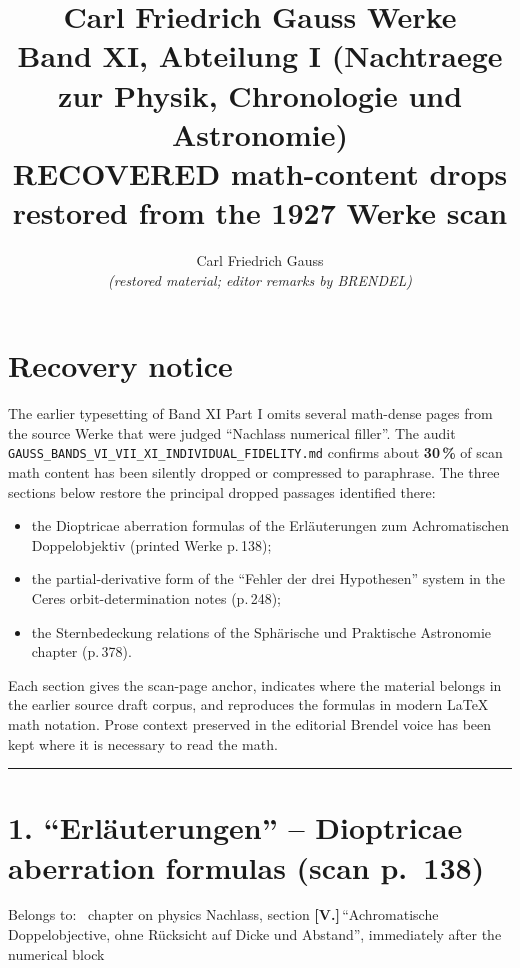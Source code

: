 \documentclass[10pt,a4paper]{article}
\title{\Huge Carl Friedrich Gauss Werke\\[0.4em]
\Large Band XI, Abteilung I (Nachtraege zur Physik, Chronologie und Astronomie)\\[0.6em]
\large RECOVERED math-content drops\\
restored from the 1927 Werke scan}
\author{Carl Friedrich Gauss \\ \textit{(restored material; editor remarks by BRENDEL)}}
\date{}
\begin{document}
\maketitle
\thispagestyle{empty}

\section*{Recovery notice}

\noindent The earlier typesetting of Band XI Part I omits several math-dense pages from
the source Werke that were judged ``Nachlass numerical filler''. The audit
\texttt{GAUSS\_BANDS\_VI\_VII\_XI\_INDIVIDUAL\_FIDELITY.md} confirms about \textbf{30\,\%}
of scan math content has been silently dropped or compressed to paraphrase.
The three sections below restore the principal dropped passages identified there:

\begin{itemize}
  \item the Dioptricae aberration formulas of the Erl\"auterungen zum
        Achromatischen Doppelobjektiv (printed Werke p.\,138);
  \item the partial-derivative form of the ``Fehler der drei Hypothesen''
        system in the Ceres orbit-determination notes (p.\,248);
  \item the Stern\-be\-deckung relations of the Sph\"arische und Praktische
        Astronomie chapter (p.\,378).
\end{itemize}

Each section gives the scan-page anchor, indicates where the material
belongs in the earlier source draft corpus, and reproduces the formulas in modern
\LaTeX{} math notation. Prose context preserved in the editorial Brendel
voice has been kept where it is necessary to read the math.

\bigskip\hrule\bigskip

\section*{1. \enquote{Erl\"auterungen} -- Dioptricae aberration formulas \hfill (scan p.~138)}


\noindent\textsf{\small Belongs to:}~ chapter on physics Nachlass,
section \textbf{[V.]}\,\enquote{Achromatische Doppelobjective, ohne R\"ucksicht
auf Dicke und Abstand}, immediately after the numerical block
\end{document}
